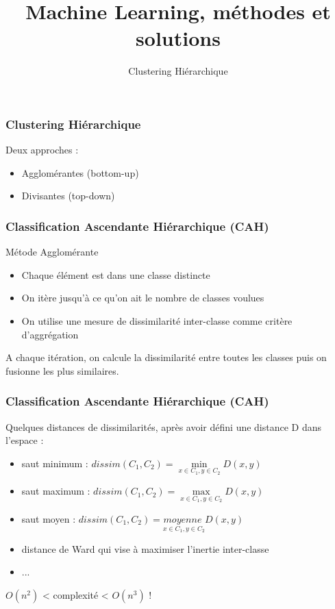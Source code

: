 \documentclass{formation}
\title{Machine Learning, méthodes et solutions}
\subtitle{Clustering Hiérarchique}
\begin{document}
\maketitle

\begin{frame}
  \frametitle{Clustering Hiérarchique}
  Deux approches :
  \begin{itemize}
  \item Agglomérantes (bottom-up)
  \item Divisantes (top-down)
  \end{itemize}
\end{frame}

\begin{frame}
  \frametitle{Classification Ascendante Hiérarchique (CAH)}
  Métode Agglomérante
  \begin{itemize}
  \item Chaque élément est dans une classe distincte
  \item On itère jusqu'à ce qu'on ait le nombre de classes voulues
  \item On utilise une mesure de dissimilarité inter-classe comme critère d'aggrégation
  \end{itemize}
  A chaque itération, on calcule la dissimilarité entre toutes les classes puis on fusionne les plus similaires.
\end{frame}

\begin{frame}
  \frametitle{Classification Ascendante Hiérarchique (CAH)}
  Quelques distances de dissimilarités, après avoir défini une distance D dans l'espace :
  \begin{itemize}
  \item saut minimum : $dissim(C_1,C_2) = \underset{x \in C_1,y \in C_2}{\min}{D(x,y)}$
  \item saut maximum : $dissim(C_1,C_2) = \underset{x \in C_1,y \in C_2}{\max}{D(x,y)}$
  \item saut moyen : $dissim(C_1,C_2) = \underset{x \in C_1,y \in C_2}{moyenne\;}{D(x,y)}$
  \item distance de Ward qui vise à maximiser l'inertie inter-classe
  \item ...
  \end{itemize}
  $O(n^2)$ < complexité < $O(n^3)$ !
\end{frame}
\end{document}
